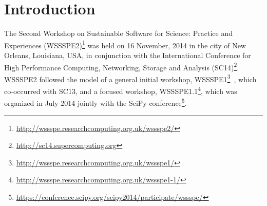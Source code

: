 \documentclass[11pt, oneside]{amsart}
\newcommand{\note}[1]{ {\textcolor{blueish}    { ***Note:      #1 }}}
\newcommand{\katznote}[1]{ {\textcolor{magenta}    { ***Dan:      #1 }}}
\newcommand{\gabnote}[1]{ {\textcolor{cyan}    { ***Gabrielle:     #1 }}}
\newcommand{\nchnote}[1]{  {\textcolor{orange}      { ***Neil: #1 }}}
\newcommand{\manishnote}[1]{  {\textcolor{violet}     { ***Manish: #1 }}}
\newcommand{\davidnote}[1]{  {\textcolor{darkgreen}      { ***David: #1 }}}
\begin{document}
\maketitle


\section{Introduction} \label{sec:intro}

%
%
%
%


The Second Workshop on Sustainable Software for Science: Practice and
Experiences
(WSSSPE2)\footnote{\url{http://wssspe.researchcomputing.org.uk/wssspe2/}} was
held on 16 November, 2014 in the city of New Orleans, Louisiana, USA, in
conjunction with the International Conference for High Performance Computing,
Networking, Storage and Analysis
(SC14)\footnote{\url{http://sc14.supercomputing.org}}. WSSSPE2 followed the
model of a general initial workshop,
WSSSPE1\footnote{\url{http://wssspe.researchcomputing.org.uk/wssspe1/}}~\cite{WSSSPE1-pre-report,WSSSPE1},
which co-occurred with SC13, and a focused workshop,
WSSSPE1.1\footnote{\url{http://wssspe.researchcomputing.org.uk/wssspe1-1/}},
which was organized in July 2014 jointly with the SciPy
conference\footnote{\url{https://conference.scipy.org/scipy2014/participate/wssspe/}}.
\end{document}
